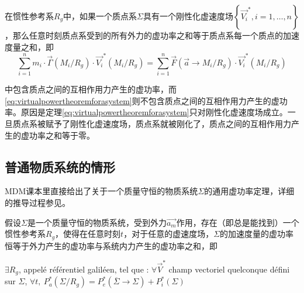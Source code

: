 \documentclass[UTF8]{ctexart}%
\begin{document}
在惯性参考系$R_g$中，如果一个质点系$\Sigma$具有一个刚性化虚速度场$\left\{\overrightarrow{V_i}^{\ast},i=1,\ldots,n\right\}$，那么任意时刻质点系受到的所有外力的虚功率之和等于质点系每一个质点的加速度量之和，即
\begin{equation}
\sum_{i=1}^n{m_i\cdot\overrightarrow{\Gamma}\left(M_i/R_g\right)}\cdot\overrightarrow{V_i}^{\ast}\left(M_i/R_g \right)=\sum_{i=1}^n\overrightarrow{F}\left( \overrightarrow{a}\rightarrow M_i/R_g \right) \cdot \overrightarrow{V_i}^{\ast}\left( M_i/R_g \right)
\label{eq:virtualpowertheoremforasystem}
\end{equation}

中包含质点之间的互相作用力产生的虚功率，而\cref{eq:virtualpowertheoremforasystem}则不包含质点之间的互相作用力产生的虚功率。原因是定理\cref{eq:virtualpowertheoremforasystem}只对刚性化虚速度场成立。一旦质点系被赋予了刚性化虚速度场，质点系就被刚化了，质点之间的互相作用力产生的虚功率之和等于零。


\subsection{普通物质系统的情形}
\label{sec:普通物质系统的情形}
MDM课本里直接给出了关于一个质量守恒的物质系统$\Sigma$的通用虚功率定理，详细的推导过程参见\cite{realandvirtualpower}。

%
%

假设$\Sigma$是一个质量守恒的物质系统，受到外力$\overrightarrow{a_m}$作用，存在（即总是能找到）一个惯性参考系$R_g$，使得在任意时刻$t$，对于任意的虚速度场，$\Sigma$的加速度量的虚功率恒等于外力产生的虚功率与系统内力产生的虚功率之和，即

$\exists R_g$, appelé référentiel galiléen, tel que : $\forall \overrightarrow{V}^{\ast}$ champ vectoriel quelconque défini sur $\Sigma$, $\forall t,\ P_a^{\ast}\left(\Sigma/R_g\right)=P_e^{\ast}\left(\overline{\Sigma}\rightarrow\Sigma\right)+P_i^{\ast}\left(\Sigma\right)\label{generalvirtualpowertheorem}$
\end{document}
